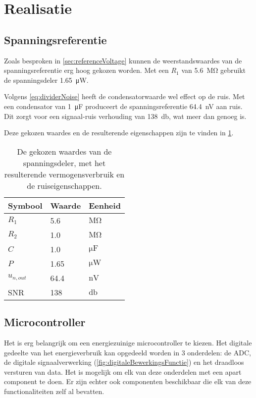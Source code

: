 \section{Realisatie}

\subsection{Spanningsreferentie}
Zoals besproken in \cref{sec:referenceVoltage} kunnen de weerstandswaardes van de spanningsreferentie erg hoog gekozen worden. Met een $R_1$ van \qty{5.6}{\mega\ohm} gebruikt de spanningsdeler \qty{1.65}{\micro\watt}.

Volgens \cref{eq:dividerNoise} heeft de condensatorwaarde wel effect op de ruis. Met een condensator van \qty{1}{\micro\farad} produceert de spanningsreferentie \qty{64.4}{\nano\volt} aan ruis. Dit zorgt voor een signaal-ruis verhouding van \qty{138}{\decibel}, wat meer dan genoeg is.

Deze gekozen waardes en de resulterende eigenschappen zijn te vinden in \cref{tab:divider}.

\begin{table}[ht]
\centering
\begin{tabular}{l|l|l}
    Symbool & Waarde & Eenheid \\
    \hline
    $R_1$       & 5.6  & $\si{\mega\ohm}$   \\
    $R_2$       & 1.0  & $\si{\mega\ohm}$   \\
    $C$         & 1.0  & $\si{\micro\farad}$\\
    $P$         & 1.65 & $\si{\micro\watt}$ \\
    $u_{n,out}$ & 64.4 & $\si{\nano\volt}$  \\
    SNR         & 138  & $\si{\decibel}$
\end{tabular}
\caption{De gekozen waardes van de spanningsdeler, met het resulterende vermogensverbruik en de ruiseigenschappen.}
\label{tab:divider}
\end{table}

\subsection{Microcontroller}
Het is erg belangrijk om een energiezuinige microcontroller te kiezen. Het digitale gedeelte van het energieverbruik kan opgedeeld worden in 3 onderdelen: de ADC, de digitale signaalverwerking (\cref{fig:digitaleBewerkingsFunctie}) en het draadloos versturen van data. Het is mogelijk om elk van deze onderdelen met een apart component te doen. Er zijn echter ook componenten beschikbaar die elk van deze functionaliteiten zelf al bevatten.

